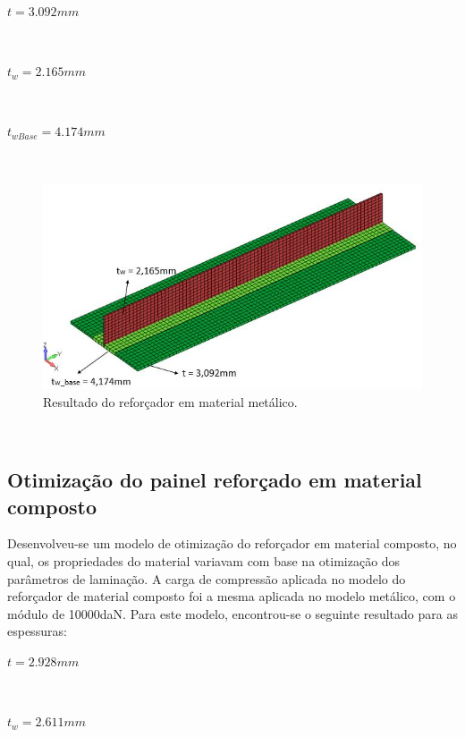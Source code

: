 \centerline{$t = 3.092 mm$}\

\centerline{$t_w = 2.165 mm$}\

\centerline{$t_{wBase} = 4.174 mm$}\

\begin{figure}[ht]
 \caption{\label{fig_Result1Metallic}Resultado do reforçador em material metálico.}
 \centering
 \includegraphics[scale=0.8]{figura/Results_Metallic}
\end{figure}
\



\subsection{Otimização do painel reforçado em material composto}

Desenvolveu-se um modelo de otimização do reforçador em material composto, no qual, os propriedades do material variavam com base na otimização dos parâmetros de laminação. A carga de compressão aplicada no modelo do reforçador de material composto foi a mesma aplicada no modelo metálico, com o módulo de 10000daN. Para este modelo, encontrou-se o seguinte resultado para as espessuras:\

\centerline{$t = 2.928 mm$}\

\centerline{$t_w = 2.611 mm$}\

